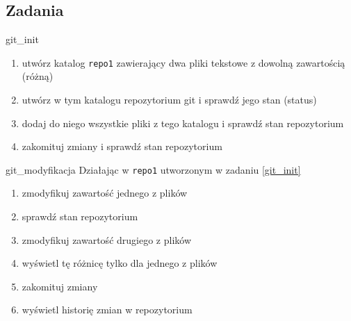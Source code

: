 \documentclass{pdfBooklets}
\begin{document}

\subsection{Zadania}

\begin{Zadanie}{}{git_init}
\begin{enumerate}
\item utwórz katalog \Verb#repo1# zawierający dwa pliki tekstowe z dowolną zawartością (różną)
\item utwórz w tym katalogu repozytorium git i sprawdź jego stan (status)
\item dodaj do niego wszystkie pliki z tego katalogu i sprawdź stan repozytorium
\item zakomituj zmiany i sprawdź stan repozytorium
\end{enumerate}
\end{Zadanie}

\begin{Zadanie}{}{git_modyfikacja}
Działając w \Verb#repo1# utworzonym w zadaniu \ref{git_init}
\begin{enumerate}
\item zmodyfikuj zawartość jednego z plików
\item sprawdź stan repozytorium
\item zmodyfikuj zawartość drugiego z plików
\item wyświetl tę różnicę tylko dla jednego z plików
\item zakomituj zmiany
\item wyświetl historię zmian w repozytorium
\end{enumerate}
\end{Zadanie}
\end{document}
